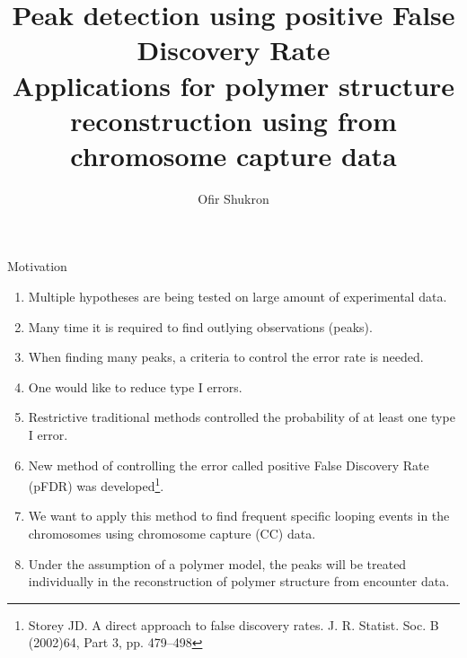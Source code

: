 \documentclass[8pt]{beamer}
\title{Peak detection using positive False Discovery Rate\\
Applications for polymer structure reconstruction using from chromosome capture data}
\author{Ofir Shukron}
\begin{document}
\begin{frame}
\titlepage
\end{frame}

\begin{frame}{Motivation}
\begin{enumerate}
\item Multiple hypotheses are being tested on large amount of experimental data. 
\item Many time it is required to find outlying observations (peaks). 
\item When finding many peaks, a criteria to control the error rate is needed.
\item One would like to reduce type I errors. 
\item Restrictive traditional methods controlled the probability of at least one type I error.
\item New method of controlling the error called positive False Discovery Rate (pFDR) was developed\footnote{Storey JD. A direct approach to false discovery rates. J. R. Statist. Soc. B (2002)64, Part 3, pp. 479–498}. 
\item We want to apply this method to find frequent specific looping events in the chromosomes using chromosome capture (CC) data.
\item Under the assumption of a polymer model, the peaks will be treated individually in the reconstruction of polymer structure from encounter data.
\end{enumerate}
\end{frame}
\end{document}
